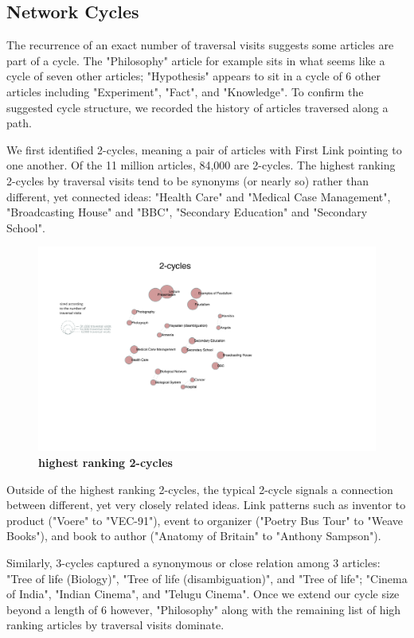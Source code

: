 \documentclass[pre,twocolumn,twoside,superscriptaddress,floatfix, aps, 10pt]{revtex4-1}
\begin{document}
\subsection{Network Cycles}

The recurrence of an exact number of traversal visits suggests some articles are part of a cycle. 
The "Philosophy" article for example sits in what seems like a cycle of seven other articles; "Hypothesis" appears to sit in a 
cycle of 6 other articles including "Experiment", "Fact", and "Knowledge".
To confirm the suggested cycle structure, we recorded the history of articles traversed along a path. 

We first identified 2-cycles, meaning a pair of articles with First Link pointing to one another.
Of the 11 million articles, 84,000 are 2-cycles. 
The highest ranking 2-cycles by traversal visits tend to be synonyms (or nearly so) rather than different, yet connected ideas:
"Health Care" and "Medical Case Management", "Broadcasting House" and "BBC", "Secondary Education" and "Secondary School".

\begin{figure}[tp!]
  \centering	
  \includegraphics[width=\textwidth]{graphics/2_cycles.pdf}
  \caption{
    \textbf{highest ranking 2-cycles}
  }
  \label{fig:2-cycles}

\end{figure}

Outside of the highest ranking 2-cycles, the typical 2-cycle signals a connection between different, yet very closely related ideas. 
Link patterns such as inventor to product ("Voere" to "VEC-91"), event to organizer ("Poetry Bus Tour" to "Weave Books"), and book to author ("Anatomy of Britain" to "Anthony Sampson").

Similarly, 3-cycles captured a synonymous or close relation among 3 articles: "Tree of life (Biology)", "Tree of life (disambiguation)", 
and "Tree of life"; "Cinema of India", "Indian Cinema", and "Telugu Cinema". Once we extend our cycle size beyond a length of 6 however, 
"Philosophy" along with the remaining list of high ranking articles by traversal visits dominate.
\end{document}
